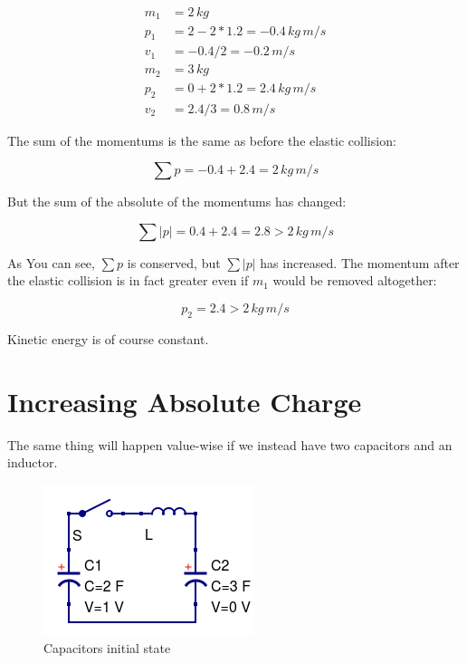 \documentclass[]{../common/elementary-physics}
\begin{document}
\begin{subequations}
\begin{align}
m_1 &= 2 \, kg \\
p_1 &= 2 - 2*1.2 = -0.4 \, kg \, m/s \\
v_1 &= -0.4 / 2 = -0.2 \, m/s \\
m_2 &= 3 \, kg \\
p_2 &= 0 + 2*1.2 = 2.4 \, kg \, m/s \\
v_2 &= 2.4 / 3 = 0.8 \, m/s
\end{align}
\end{subequations}

The sum of the momentums is the same as before the elastic collision:

\begin{equation}
\sum p = -0.4 + 2.4 = 2 \, kg \, m/s
\end{equation}

But the sum of the absolute of the momentums has changed:

\begin{equation}
\sum | p | = 0.4 + 2.4 = 2.8 > 2 \, kg \, m/s
\end{equation}

As You can see, $\sum p$ is conserved, but $\sum | p |$ has increased.
The momentum after the elastic collision is in fact greater even if $m_1$ would be removed altogether:

\begin{equation}
p_2 = 2.4 > 2 \, kg \, m/s
\end{equation}

Kinetic energy is of course constant.
 
\section{Increasing Absolute Charge}

The same thing will happen value-wise if we instead have two capacitors and an inductor.

\begin{figure}[ht] \centering
	\includegraphics[scale=.5]{ccl7} \caption{Capacitors initial state}
\end{figure}
\end{document}

